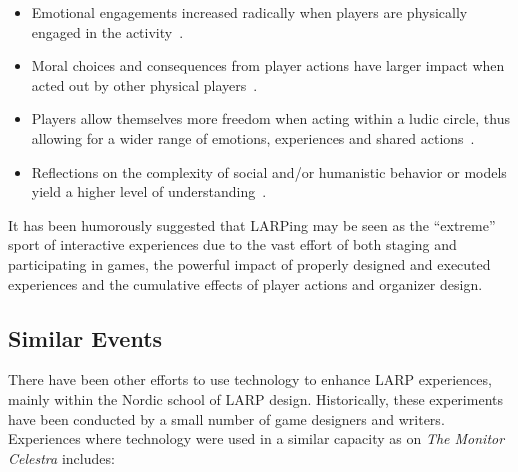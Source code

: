 \begin{itemize}
\item Emotional engagements increased radically when players are physically engaged in the activity~\cite{turku3}.
\item Moral choices and consequences from player actions have larger impact when acted out by other physical players~\cite{turku3}.
\item Players allow themselves more freedom when acting within a ludic circle, thus allowing for a wider range of emotions, experiences and shared actions~\cite{montola2012,stenros2012}.
\item Reflections on the complexity of social and/or humanistic behavior or models yield a higher level of understanding~\cite{henriksen2004}. 
\end{itemize}

It has been humorously suggested that LARPing may be seen as the ``extreme'' sport of interactive experiences due to the vast effort of both staging and participating in games, the powerful impact of properly designed and executed experiences and the cumulative effects of player actions and organizer design. 

\subsection{Similar Events}

There have been other efforts to use technology to enhance LARP experiences, mainly within the Nordic school of LARP design.  Historically, these experiments have been conducted by a small number of game designers and writers. Experiences where technology were used in a similar capacity as on \emph{The Monitor Celestra} includes: 

